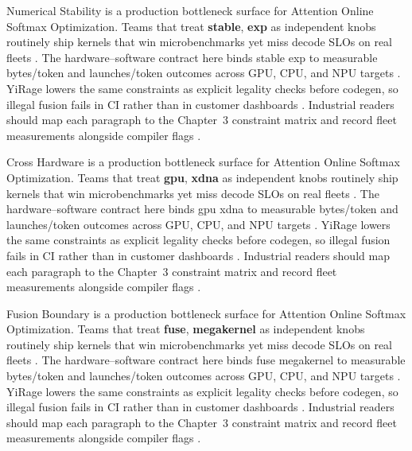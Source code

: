Numerical Stability is a production bottleneck surface for Attention Online Softmax Optimization. Teams that treat \textbf{stable}, \textbf{exp} as independent knobs routinely ship kernels that win microbenchmarks yet miss decode SLOs on real fleets \citep{amd2024xdna,dao2022flashattention}. The hardware--software contract here binds stable exp to measurable bytes/token and launches/token outcomes across GPU, CPU, and NPU targets \citep{amd2024aie,kwon2023vllm}. YiRage lowers the same constraints as explicit legality checks before codegen, so illegal fusion fails in CI rather than in customer dashboards \citep{dlbook,nvidia2024cudagraphs}. Industrial readers should map each paragraph to the Chapter~3 constraint matrix and record fleet measurements alongside compiler flags \citep{dao2022flashattention,liu2024deepseekv3}.

Cross Hardware is a production bottleneck surface for Attention Online Softmax Optimization. Teams that treat \textbf{gpu}, \textbf{xdna} as independent knobs routinely ship kernels that win microbenchmarks yet miss decode SLOs on real fleets \citep{amd2024aie,kwon2023vllm}. The hardware--software contract here binds gpu xdna to measurable bytes/token and launches/token outcomes across GPU, CPU, and NPU targets \citep{dlbook,nvidia2024cudagraphs}. YiRage lowers the same constraints as explicit legality checks before codegen, so illegal fusion fails in CI rather than in customer dashboards \citep{dao2022flashattention,liu2024deepseekv3}. Industrial readers should map each paragraph to the Chapter~3 constraint matrix and record fleet measurements alongside compiler flags \citep{kwon2023vllm,patel2025llminference}.

Fusion Boundary is a production bottleneck surface for Attention Online Softmax Optimization. Teams that treat \textbf{fuse}, \textbf{megakernel} as independent knobs routinely ship kernels that win microbenchmarks yet miss decode SLOs on real fleets \citep{dlbook,nvidia2024cudagraphs}. The hardware--software contract here binds fuse megakernel to measurable bytes/token and launches/token outcomes across GPU, CPU, and NPU targets \citep{dao2022flashattention,liu2024deepseekv3}. YiRage lowers the same constraints as explicit legality checks before codegen, so illegal fusion fails in CI rather than in customer dashboards \citep{kwon2023vllm,patel2025llminference}. Industrial readers should map each paragraph to the Chapter~3 constraint matrix and record fleet measurements alongside compiler flags \citep{nvidia2024cudagraphs,taxbreak2026}.

